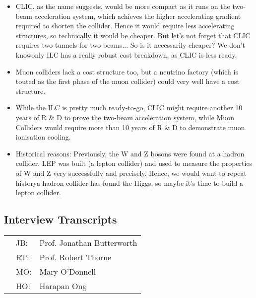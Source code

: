 \begin{itemize}
\item CLIC, as the name suggests, would be more compact as it runs on the two-beam acceleration system, which achieves the higher accelerating gradient required to shorten the collider. Hence it would require less accelerating structures, so technically it would be cheaper. But let's not forget that CLIC requires two tunnels for two beams... So is it necessarily cheaper? We don't know\textemdash only ILC has a really robust cost breakdown, as CLIC is less ready.

\item Muon colliders lack a cost structure too, but a neutrino factory (which is touted as the first phase of the muon collider) could very well have a cost structure. 

\item While the ILC is pretty much ready-to-go, CLIC might require another 10 years of R \& D to prove the two-beam acceleration system, while Muon Colliders would require more than 10 years of R \& D to demonstrate muon ionisation cooling.

\item Historical reasons: Previously, the W and Z bosons were found at a hadron collider. LEP was built (a lepton collider) and used to measure the properties of W and Z very successfully and precisely. Hence, we would want to repeat history\textemdash a hadron collider has found the Higgs, so maybe it's time to build a lepton collider.
\end{itemize}

\clearpage

\subsection{Interview Transcripts}
\begin{table}[!ht]
\begin{tabular}{@{}p{0mm}p{5mm}p{130mm}@{}}
& JB: & Prof. Jonathan Butterworth\\
& RT: & Prof. Robert Thorne\\
& MO: & Mary O'Donnell\\
& HO: & Harapan Ong
\end{tabular}
\end{table}

